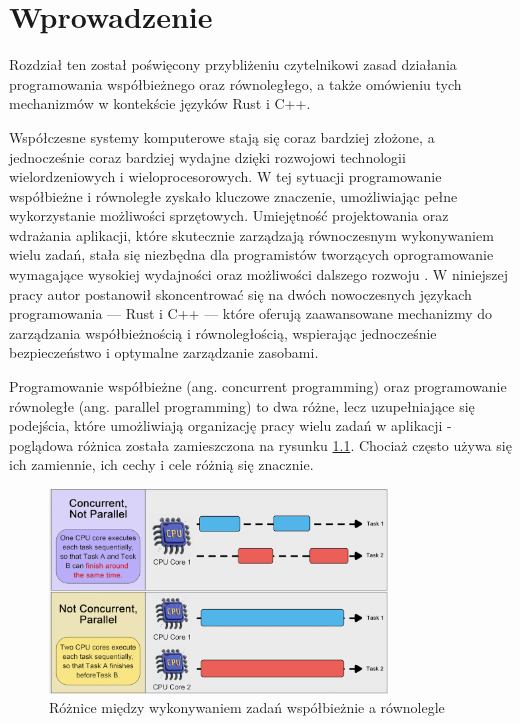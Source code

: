 \chapter{Wprowadzenie}
Rozdział ten został poświęcony przybliżeniu czytelnikowi zasad działania programowania współbieżnego oraz równoległego, a także omówieniu tych mechanizmów w kontekście języków Rust i C++.

Współczesne systemy komputerowe stają się coraz bardziej złożone, a jednocześnie coraz bardziej wydajne dzięki rozwojowi technologii wielordzeniowych i wieloprocesorowych. W tej sytuacji programowanie współbieżne i równoległe zyskało kluczowe znaczenie, umożliwiając pełne wykorzystanie możliwości sprzętowych. Umiejętność projektowania oraz wdrażania aplikacji, które skutecznie zarządzają równoczesnym wykonywaniem wielu zadań, stała się niezbędna dla programistów tworzących oprogramowanie wymagające wysokiej wydajności oraz możliwości dalszego rozwoju \cite{IntroductionToConcurrencyAndParallelism, ConcurrencyInAction, ProgramminInOpenMp, ParallelProgramminginC++withOpenMP}. W niniejszej pracy autor postanowił skoncentrować się na dwóch nowoczesnych językach programowania — Rust i C++ — które oferują zaawansowane mechanizmy do zarządzania współbieżnością i równoległością, wspierając jednocześnie bezpieczeństwo i optymalne zarządzanie zasobami.

Programowanie współbieżne (ang. concurrent programming) oraz programowanie równoległe (ang. parallel programming) to dwa różne, lecz uzupełniające się podejścia, które umożliwiają organizację pracy wielu zadań w aplikacji - poglądowa różnica została zamieszczona na rysunku \ref{fig:concurrent_vs_parallel}. Chociaż często używa się ich zamiennie, ich cechy i cele różnią się znacznie.

\begin{figure}[H]
    \centering
    \includegraphics[width=0.8\textwidth]{images/ConcurrentParallelCompare.png}
    \caption{Różnice między wykonywaniem zadań współbieżnie a równolegle \cite{bytebytegoEP108Design}}
    \label{fig:concurrent_vs_parallel}
\end{figure}


